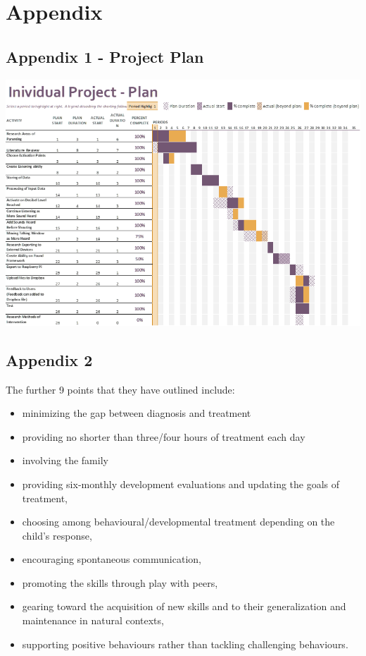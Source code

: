 \documentclass[a4paper,11pt]{report}
\begin{document}
\chapter{Appendix}
\section{Appendix 1 - Project Plan}

\includegraphics{Plan.PNG}
\pagebreak

\section{Appendix 2}
The further 9 points that they have outlined include:\\
\begin{itemize}
\item minimizing the gap between diagnosis and treatment
\item providing no shorter than three/four hours of treatment each day
\item involving the family
\item providing six-monthly development evaluations and updating the goals of treatment, 
\item choosing among behavioural/developmental treatment depending on the child’s response,
\item	encouraging spontaneous communication,
\item	promoting the skills through play with peers,
\item	gearing toward the acquisition of new skills and to their generalization and maintenance in natural contexts,
\item	supporting positive behaviours rather than tackling challenging behaviours. 
\end{itemize}
\end{document}
